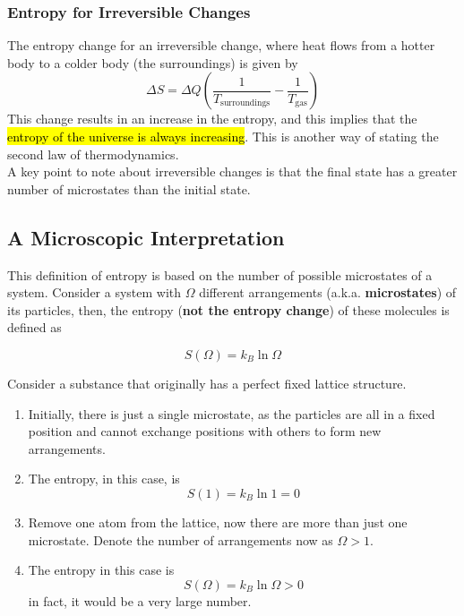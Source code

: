 \documentclass[a4paper,12pt]{article}
\newcommand{\lb}{\\[8pt]}
\begin{document}
\pagebreak

\subsubsection{Entropy for Irreversible Changes}

The entropy change for an irreversible change, where heat flows from a hotter body to a colder body (the surroundings) is given by
\begin{equation}\label{eq:irreversible}
  \Delta S =\Delta Q\left(\frac{1}{T_\text{surroundings}} - \frac{1}{T_\text{gas}}\right)
\end{equation}
This change results in an increase in the entropy, and this implies that the \hl{entropy of the universe is always increasing}. This is another way of stating the second law of thermodynamics.\lb
A key point to note about irreversible changes is that the final state has a greater number of microstates than the initial state.

\pagebreak

\subsection{A Microscopic Interpretation}

This definition of entropy is based on the number of possible microstates of a system. Consider a system with $\Omega$ different arrangements (a.k.a. \textbf{microstates}) of its particles, then, the entropy (\textbf{not the entropy change}) of these molecules is defined as

\begin{equation}\label{eq:microentropy}
  S(\Omega) = k_B\ln\Omega
\end{equation}

Consider a substance that originally has a perfect fixed lattice structure.
\begin{enumerate}
  \item Initially, there is just a single microstate, as the particles are all in a fixed position and cannot exchange positions with others to form new arrangements.
  \item The entropy, in this case, is $$S(1) = k_B\ln 1 = 0$$
  \item Remove one atom from the lattice, now there are more than just one microstate. Denote the number of arrangements now as $\Omega > 1$.
  \item The entropy in this case is $$S(\Omega) = k_B\ln\Omega > 0$$
        in fact, it would be a very large number.
\end{enumerate}
\end{document}
